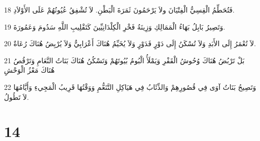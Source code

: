 \par 18 فَتُحَطِّمُ الْقِسِيُّ الْفِتْيَانَ ولاَ يَرْحَمُونَ ثَمَرَةَ الْبَطْنِ. لاَ تُشْفِقُ عُيُونُهُمْ عَلَى الأَوْلاَدِ.
\par 19 وَتَصِيرُ بَابِلُ بَهَاءُ الْمَمَالِكِ وَزِينَةُ فَخْرِ الْكِلْدَانِيِّينَ كَتَقْلِيبِ اللَّهِ سَدُومَ وَعَمُورَةَ.
\par 20 لاَ تُعْمَرُ إِلَى الأَبَدِ وَلاَ تُسْكَنُ إِلَى دَوْرٍ فَدَوْرٍ وَلاَ يُخَيِّمُ هُنَاكَ أَعْرَابِيٌّ وَلاَ يُرْبِضُ هُنَاكَ رُعَاةٌ.
\par 21 بَلْ تَرْبُضُ هُنَاكَ وُحُوشُ الْقَفْرِ وَيَمْلَأُ الْبُومُ بُيُوتَهُمْ وَتَسْكُنُ هُنَاكَ بَنَاتُ النَّعَامِ وَتَرْقُصُ هُنَاكَ مَعْزُ الْوَحْشِ
\par 22 وَتَصِيحُ بَنَاتُ آوَى فِي قُصُورِهِمْ وَالذِّئَابُ فِي هَيَاكِلِ التَّنَعُّمِ وَوَقْتُهَا قَرِيبُ الْمَجِيءِ وَأَيَّامُهَا لاَ تَطُولُ.

\chapter{14}

